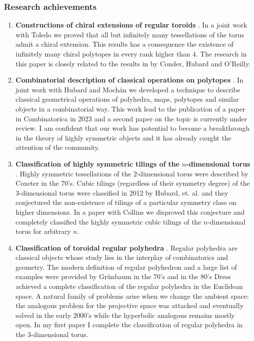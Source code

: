 \subsubsection*{Research achievements}
\begin{enumerate}
  \item \textbf{Constructions of chiral extensions of regular toroids} \cite{MonteToled_ChiralExtensionsRegular_preprint}. In a joint work with Toledo we proved that all but infinitely many tessellations of the torus admit a chiral extension. 
  This results has a consequence the existence of infinitely many chiral polytopes in every rank higher than $4$. 
  The research in this paper is closely related to the results in \cite{CondHubORe2024_ConstructionChiralPolytopes} by Conder, Hubard and O'Reilly.
  
	\item \textbf{Combinatorial description of classical operations on polytopes} \cite{HubaMocMon2023_VoltageOperationsManiplexes,HubaMocMon_SymmetriesVoltageOperations_preprint}. In joint work with Hubard and Mochán we developed a technique to describe classical geometrical operations of polyhedra, maps, polytopes and similar objects in a combinatorial way. This work lead to the publication of a paper in Combinatorica in 2023 \cite{HubaMocMon2023_VoltageOperationsManiplexes} and a second paper \cite{HubaMocMon_SymmetriesVoltageOperations_preprint} on the topic is currently under review.
	I am confident that our work has potential to become a breakthrough in the theory of highly symmetric objects and it has already caught the attention of the community.
  
	\item \textbf{Classification of highly symmetric tilings of the $n$-dimensional torus} \cite{ColliMonte2021_EquivelarToroidsFew}. Highly symmetric tessellations of the $2$-dimensional torus were described by Coxeter in the 70's. Cubic tilings (regardless of their symmetry degree) of the $3$-dimensional torus were classified in 2012 by Hubard, et. al. \cite{HubOrbPeWe2012_SymmetriesEquivelar4} and they conjectured the non-existence of tilings of a particular symmetry class on higher dimensions. 
  In a paper with Collins \cite{ColliMonte2021_EquivelarToroidsFew} we disproved this conjecture and completely classified the highly symmetric cubic tilings of the $n$-dimensional torus for arbitrary $n$. 
	\item \textbf{Classification of toroidal regular polyhedra} \cite{Montero2018_RegularPolyhedra3}. Regular polyhedra are classical objects whose study lies in the interplay of combinatorics and geometry. 
  The modern definition of regular polyhedron and a large list of examples were provided by Grünbaum in the 70's and in the 80's Dress achieved a complete classification of the regular polyhedra in the Euclidean space. A natural family of problems arise when we change the ambient space: the analogous problem for the projective space was attacked and eventually solved in the early 2000's while the hyperbolic analogous remains mostly open. In my first paper \cite{Montero2018_RegularPolyhedra3} I complete the classification of regular polyhedra in the $3$-dimensional torus.
  

\end{enumerate}

